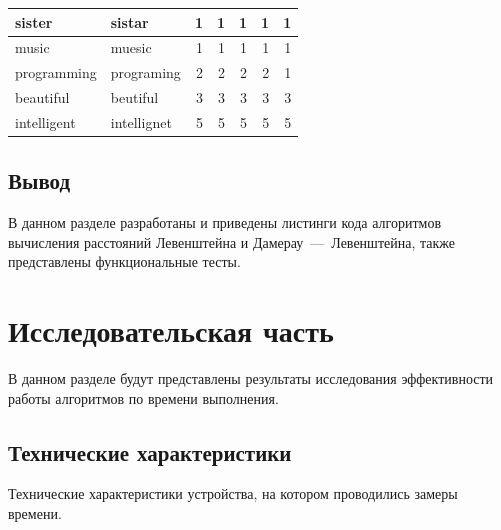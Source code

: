 \documentclass[a4paper, 12pt]{extreport}
\begin{document}
\begin{table}[h]
\begin{center}
\begin{threeparttable}
\begin{tabular}{|l|l|rrrrr|}
            sister                      & sistar                      & \multicolumn{1}{r|}{1}      & \multicolumn{1}{r|}{1}       & \multicolumn{1}{r|}{1}       & \multicolumn{1}{r|}{1}            & 1     \\ \hline
            music                       & muesic                      & \multicolumn{1}{r|}{1}      & \multicolumn{1}{r|}{1}       & \multicolumn{1}{r|}{1}       & \multicolumn{1}{r|}{1}            & 1     \\ \hline
            programming                 & programing                  & \multicolumn{1}{r|}{2}      & \multicolumn{1}{r|}{2}       & \multicolumn{1}{r|}{2}       & \multicolumn{1}{r|}{2}            & 1     \\ \hline
            beautiful                   & beutiful                    & \multicolumn{1}{r|}{3}      & \multicolumn{1}{r|}{3}       & \multicolumn{1}{r|}{3}       & \multicolumn{1}{r|}{3}            & 3     \\ \hline
            intelligent                 & intellignet                 & \multicolumn{1}{r|}{5}      & \multicolumn{1}{r|}{5}       & \multicolumn{1}{r|}{5}       & \multicolumn{1}{r|}{5}            & 5     \\ \hline
        \end{tabular}
    \end{threeparttable}
    \end{center}
\end{table}

\section*{Вывод}
В данном разделе разработаны и приведены листинги кода алгоритмов вычисления расстояний Левенштейна и Дамерау~---~Левенштейна, также представлены функциональные тесты.


\chapter{Исследовательская часть}
В данном разделе будут представлены результаты исследования эффективности работы алгоритмов по времени выполнения.

\section{Технические характеристики}
Технические характеристики устройства, на котором проводились замеры времени.
\end{document}
